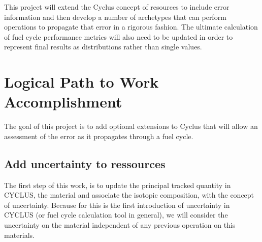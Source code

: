 \documentclass[dvips,12pt]{article}
\begin{document}
This project
will extend the Cyclus concept of resources to
include error information and then develop a
number of archetypes that can perform operations
to propagate that error in a rigorous fashion.
The ultimate calculation of fuel cycle performance
metrics will also need to be updated in order to
represent final results as distributions rather
than single values.

\section{Logical Path to Work Accomplishment}
The goal of this project is to add optional
extensions to Cyclus that will allow an assessment
of the error as it propagates through a fuel
cycle.

\subsection{Add uncertainty to ressources}
The first step of this work, is to update the
principal tracked quantity in CYCLUS, the material and
associate the isotopic composition, with the concept of
uncertainty. 
Because for this is the first
introduction of uncertainty in CYCLUS (or fuel
cycle calculation tool in general), we will
consider the uncertainty on the material
independent of any previous operation on this
materials.
\end{document}
